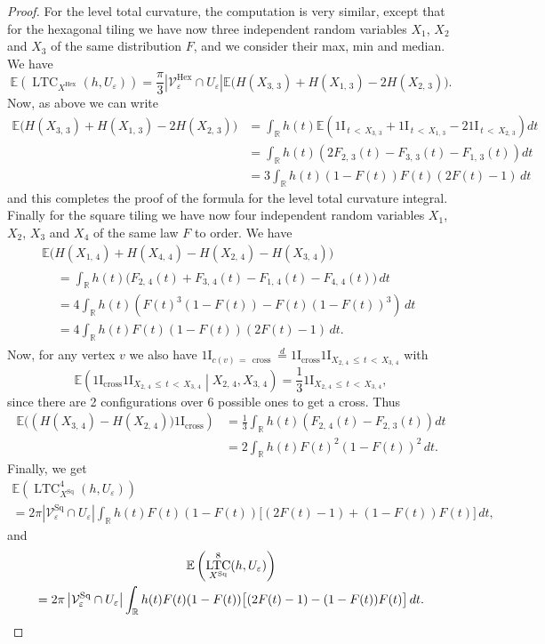 \documentclass[10pt]{amsart}
\theoremstyle{definition}\newtheorem{defi}[theo]{Definition}\newtheorem{rema}[theo]{Remark}\newtheorem{exam}[theo]{Example}\newtheorem{exem}[theo]{Example}\newtheorem{nota}[theo]{Notation}
\newcommand{\R}{\mathbb{R}}
\newcommand{\E}{\mathbb{E}}
\newcommand{\ind}{{1\!\!\mathrm{I}}}
\newcommand{\eps}{\varepsilon}
\DeclareMathOperator{\LTC}{LTC}
\DeclareMathOperator{\Hex}{Hex}
\DeclareMathOperator{\Sq}{Sq}
\DeclareMathOperator{\cross}{cross}
\newcommand{\calV}{\mathcal{V}}
\begin{document}
\begin{proof}
For the level total curvature, the computation is very similar, except that for the hexagonal tiling we have now three independent random variables $X_1$, $X_2$ and $X_3$ of the same distribution $F$, and we consider their max, min and median. We have
\[
\E\left(\LTC_{X^{\Hex}}(h,U_{\eps})\right) = \frac{\pi}{3} \left|\calV_{\eps}^{\Hex}\cap U_{\eps}\right| \E\big(H\left(X_{3,\,3}\right) +
H\left(X_{1,\,3}\right) - 2 H\left(X_{2,\,3}\right)\big).
\]
Now, as above we can write
\begin{align*}
\E\big(H\left(X_{3,\,3}\right) + H\left(X_{1,\,3}\right) - 2 H\left(X_{2,\,3}\right)\big) & = \int_\R h(t) \E\left(
\ind_{\,t\,<\,X_{3,\,3}}+\ind_{\,t\,<\, X_{1,\,3}}-2\ind_{\,t\,<\,X_{2,\,3}} \right)dt \\
&=\int_\R h(t) \left(2F_{2,\,3}(t)-F_{3,\,3}(t)-F_{1,\,3}(t)\right)dt\\
& =3 \int_\R h(t) (1- F(t)) F(t) (2F(t) -1) \, dt
\end{align*}
and this completes the proof of the formula for the level total curvature integral. Finally for the square tiling we have now four independent random variables $X_1$, $X_2$, $X_3$ and $X_4$ of the same law $F$ to order. We have
\begin{multline*}
\E\big(H\left(X_{1,\,4}\right) + H\left(X_{4,\,4}\right) -H\left(X_{2,\,4}\right) -H\left(X_{3,\,4}\right)\big) \\
\begin{aligned}
&= \int_\R h(t)\big(F_{2,\,4}(t)+F_{3,\,4}(t)-F_{1,\,4}(t)-F_{4,\,4}(t)\big)\, dt\\
& = 4 \int_\R h(t) \left(F(t)^3(1-F(t))-F(t)(1-F(t))^3\right) \, dt \\
&=4 \int_\R h(t) F(t)(1- F(t))(2F(t) -1) \, dt.
\end{aligned}
\end{multline*}
Now, for any vertex $v$ we also have $\ind_{c(v)\,=\,\cross}\stackrel{d}{=}\ind_{\cross}\ind_{X_{2,\,4}\,\le\,t\,<\,X_{3,\,4}}$ with
\[
\E\left(\ind_{\cross}\ind_{X_{2,\,4}\,\le\,t\,<\,X_{3,\,4}}\middle|X_{2,\,4},X_{3,\,4}\right)=\frac{1}{3}\ind_{X_{2,\,4}\,\le\,t\,<\,X_{3,\,4}},
\]
since there are 2 configurations over 6 possible ones to get a cross. Thus
\begin{align*}
\E\big(\left(H\left(X_{3,\,4}\right) -H\left(X_{2,\,4}\right)\big) \ind_{\cross}\right) & = \frac{1}{3}\int_\R h(t) \left(F_{2,\,4}(t)-F_{2,\,3}(t)\right) dt\\
&=2\int_\R h(t) F(t)^2(1- F(t))^2\,dt.
\end{align*}
Finally, we get
\begin{multline*}
\E\left(\LTC^4_{X^{\Sq}}(h,U_{\eps})\right)\\
= 2\pi \left|\calV_\eps^{\Sq} \cap U_\eps\right|\int_\R h(t) F(t)
(1- F(t)) \big[(2F(t) - 1) +(1-F(t))F(t)\big] \,dt,
\end{multline*}
and
\begin{multline*}
\E\left(\LTC^8_{X^{\Sq}}(h,U_\eps)\right)\\
= 2\pi \left|\calV_\eps^{\Sq} \cap U_\eps\right| \int_\R h(t) F(t)
(1- F(t)) \big[(2F(t) - 1) - (1-F(t))F(t)\big] \,dt.\qedhere
\end{multline*}
\end{proof}
\end{document}
